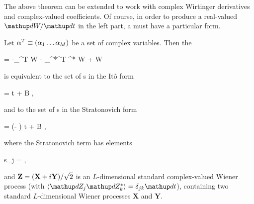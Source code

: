 The above theorem can be extended to work with complex Wirtinger derivatives and complex-valued coefficients.
Of course, in order to produce a real-valued $\upd W/\upd t$ in the left part, a  must have a particular form.

\begin{theorem}
\label{thm:fpe-sde:corr:fpe-sde-complex}
	Let $\mathbf{\alpha}^T \equiv (\alpha_1 \ldots \alpha_M)$ be a set of complex variables.
	Then the 
	\begin{eqn*}
		= -\vcwd_{\balpha}^T \avec W - \vcwd_{\balpha^*}^T \avec^* W
		+  W
	\end{eqn*}
	is equivalent to the set of s in the It\^o form
	\begin{eqn*}
		\upd\balpha = \avec \upd t + B \upd\Zvec,
	\end{eqn*}
	and to the set of s in the Stratonovich form
	\begin{eqn*}
		\upd\balpha = (\avec - \svec) \upd t + B \upd\Zvec,
	\end{eqn*}
	where the Stratonovich term has elements
	\begin{eqn*}
		s_j =  \Trace{ B^H \vcwd_{\balpha^*} \evec_j^T B },
	\end{eqn*}
	and $\mathbf{Z} = (\mathbf{X} + i\mathbf{Y}) / \sqrt{2}$ is an $L$-dimensional standard complex-valued Wiener process (with $\langle \upd Z_j \upd Z_k^* \rangle = \delta_{jk} \upd t$), containing two standard $L$-dimensional Wiener processes $\mathbf{X}$ and $\mathbf{Y}$.
\end{theorem}
